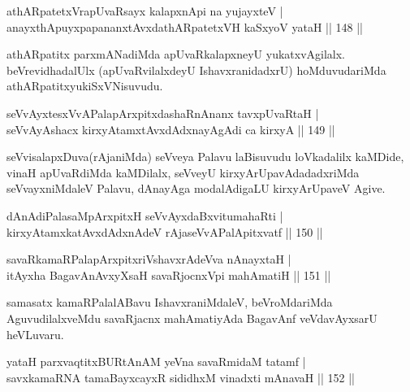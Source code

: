 \begin{shl}
athARpatetxVrapUvaRsayx kalapxnA\s pi na yujayxteV |\\
anayxthA\s puyxpapananxtAvxdathARpatetxVH kaSxyoV yataH \hfill || 148 ||
\end{shl}

\begin{artha}
athARpatitx parxmANadiMda apUvaRkalapxneyU yukatxvAgilalx. beVrevidhadalUlx (apUvaRvilalxdeyU IshavxranidadxrU) hoMduvudariMda athARpatitxyu\break kiSxVNisuvudu.
\end{artha}

\begin{shl}
seVvAyxtesxVvAPalapArxpitxdashaRnAnanx tavxpUvaRtaH |\\
seVvAyAshacx kirxyAtamxtAvxdAdxnayAgAdi ca kirxyA \hfill || 149 ||
\end{shl}

\begin{artha}
seVvisalapxDuva(rAjaniMda) seVveya Palavu laBisuvudu loVkadalilx kaMDide, vinaH apUvaRdiMda kaMDilalx, seVveyU kirxyArUpavAdadadxriMda seVvayxniMdaleV Palavu, dAnayAga modalAdigaLU kirxyArUpaveV Agive.
\end{artha}


\begin{shl}
dAnAdiPalasaMpArxpitxH seVvAyxdaBxvitumahaRti |\\
kirxyAtamxkatAvxdAdxnAdeV rAjaseVvAPalApitxvatf \hfill || 150 ||
\end{shl}

\begin{shl}
savaRkamaRPalapArxpitxriVshavxrAdeVva nAnayxtaH |\\
itAyxha BagavAnAvxyXsaH savaRjocnxV\s pi mahAmatiH \hfill || 151 ||
\end{shl}

\begin{artha}%
samasatx kamaRPalalABavu IshavxraniMdaleV, beVroMdariMda AguvudilalxveMdu savaRjacnx mahAmatiyAda BagavAnf veVdavAyxsarU heVLuvaru.
\end{artha}


\begin{shl}
yataH parxvaqtitxBURtAnAM yeVna savaRmidaM tatamf |\\
savxkamaRNA tamaBayxcayxR sididhxM vinadxti mAnavaH \hfill || 152 ||
\end{shl}

